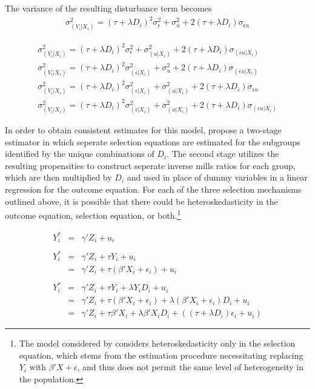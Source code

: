 \documentclass{article}
\begin{document}
The variance of the resulting disturbance term becomes
\begin{eqnarray*}
\sigma_{(V_i|X_i)}^2=(\tau+\lambda D_i)^2\sigma_{\epsilon}^2 +\sigma_{u}^2 + 2(\tau+\lambda D_i)\sigma_{\epsilon u}
\end{eqnarray*}

\begin{eqnarray*}
\sigma_{(V_i|X_i)}^2=(\tau+\lambda D_i)^2\sigma_{\epsilon}^2 +\sigma_{(u|X_i)}^2 + 2(\tau+\lambda D_i)\sigma_{(\epsilon u|X_i)} \\
\sigma_{(V_i|X_i)}^2=(\tau+\lambda D_i)^2\sigma_{(\epsilon|X_i)}^2 +\sigma_{u}^2 + 2(\tau+\lambda D_i)\sigma_{(\epsilon u|X_i)} \\
\sigma_{(V_i|X_i)}^2=(\tau+\lambda D_i)^2\sigma_{(\epsilon|X_i)}^2 +\sigma_{(u|X_i)}^2 + 2(\tau+\lambda D_i)\sigma_{\epsilon u} \\
\sigma_{(V_i|X_i)}^2=(\tau+\lambda D_i)^2\sigma_{(\epsilon|X_i)}^2 +\sigma_{(u|X_i)}^2 + 2(\tau+\lambda D_i)\sigma_{(\epsilon u|X_i)} 
\end{eqnarray*}


In order to obtain consistent estimates for this model, \citet{reichert2014} propose a two-stage estimator in which seperate selection equations are estimated for the subgroups identified by the unique combinations of $D_i$.  The second stage utilizes the resulting propensities to construct seperate inverse mills ratios for each group, which are then multiplied by $D_i$ and used in place of dummy variables in a linear regression for the outcome equation.  For each of the three selection mechanisms outlined above, it is possible that there could be heteroskedasticity in the outcome equation, selection equation, or both.\footnote{The model considered by \citet{reichert2014} considers heteroskedasticity only in the selection equation, which stems from the estimation procedure necessitating replacing $Y_i$ with $\beta'X + \epsilon$, and thus does not permit the same level of heterogeneity in the population.}
 
\begin{eqnarray*}
Y^*_i&=&\gamma'Z_i + u_i \\
    \\
Y^*_i&=&\gamma'Z_i +\tau Y_i + u_i \\
     &=&\gamma'Z_i +\tau(\beta'X_i + \epsilon_i) + u_i \\
     \\
Y^*_i&=&\gamma'Z_i +\tau Y_i +\lambda Y_iD_i + u_i \\
     &=&\gamma'Z_i +\tau(\beta'X_i + \epsilon_i) + \lambda (\beta'X_i + \epsilon_i)D_i + u_i \\
     &=&\gamma'Z_i +\tau\beta'X_i + \lambda\beta'X_iD_i+((\tau+\lambda D_i)\epsilon_i + u_i)
\end{eqnarray*}
\end{document}
